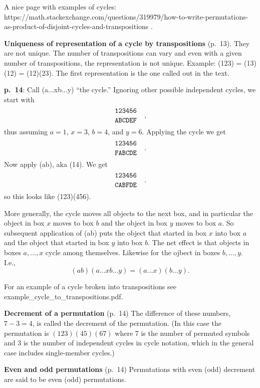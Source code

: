 \documentclass{book}
\begin{document}
A nice page with examples of cycles:
https://math.stackexchange.com/questions/319979/how-to-write-permutations-as-product-of-disjoint-cycles-and-transpositions
.

{\bf Uniqueness of representation of a cycle by transpositions}
(p.\ 13). They are not unique. The number of transpositions can vary
and even with a given number of transpositions, the representation is
not unique. Example: (123) = (13)(12) = (12)(23). The first
representation is the one called out in the text.

{\bf p.\ 14}: Call (a...xb...y) ``the cycle.'' Ignoring other possible
independent cycles, we start with
$$
\genfrac{}{}{0pt}0{\tt 123456}{\tt ABCDEF}\quad,
$$
thus assuming $a=1$, $x=3$, $b=4$, and $y=6$. Applying the cycle we get
$$
\genfrac{}{}{0pt}0{\tt 123456}{\tt FABCDE}\quad.
$$
Now apply (ab), aka (14). We get
$$
\genfrac{}{}{0pt}0{\tt 123456}{\tt CABFDE}\quad.
$$
so this looks like (123)(456).

More generally, the cycle moves all objects to the next box, and in
particular the object in box $x$ moves to box $b$ and the object in
box $y$ moves to box $a$. So subsequent application of (ab) puts the
object that started in box $x$ into box $a$ and the object that
started in box $y$ into box $b$. The net effect is that objects in
boxes $a,...,x$ cycle among themselves. Likewise for the ojbect in
boxes $b,...,y$. I.e.,
$$
(ab)(a...xb...y) = (a...x)(b...y).
$$

For an example of a cycle broken into transpositions see
example\_cycle\_to\_transpositions.pdf.

{\bf Decrement of a permutation} (p.\ 14) The difference of these
numbers, $7-3 = 4$, is called the decrement of the permutation. (In
this case the permutation is $(123)(45)(67)$ where 7 is the number of
permuted symbols and 3 is the number of independent cycles in cycle
notation, which in the general case includes single-member cycles.)

{\bf Even and odd permutations} (p.\ 14) Permutations with even (odd)
decrement are said to be even (odd) permutations.
\end{document}

